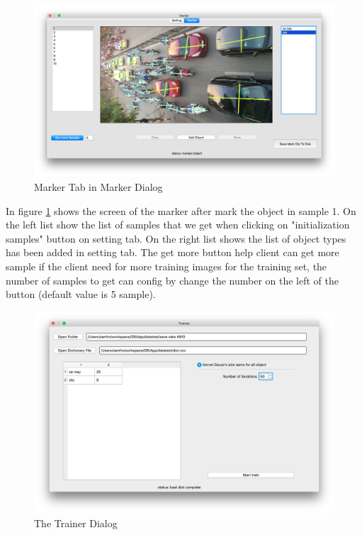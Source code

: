 \begin{center}
    \begin{figure}[H]
      \includegraphics[width=\textwidth]{Chapters/Fig/marker-set}
      \caption{Marker Tab in Marker Dialog}
      \label{fig:marker-set}
    \end{figure}
  \end{center}
  \begin{center}
\end{center}

In figure \ref{fig:marker-set} shows the screen of the marker after mark the object in sample 1. On the left list show the list of samples that we get when clicking on "initialization samples" button on setting tab. On the right list shows the list of object types has been added in setting tab. The get more button help client can get more sample if the client need for more training images for the training set, the number of samples to get can config by change the number on the left of the button (default value is 5 sample). 

\begin{center}
    \begin{figure}[H]
      \includegraphics[width=\textwidth]{Chapters/Fig/trainer}
      \caption{The Trainer Dialog}
      \label{fig:Trainer}
    \end{figure}
  \end{center}
  \begin{center}
\end{center}

